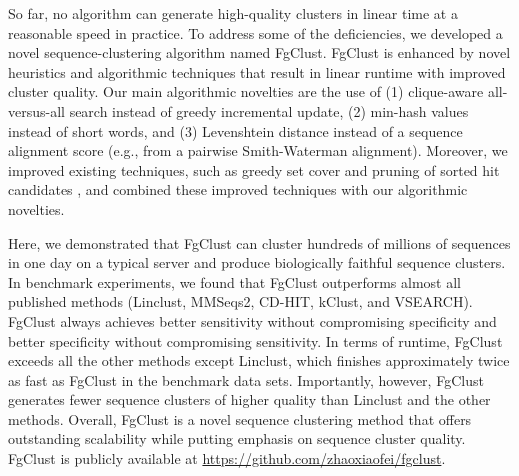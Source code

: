 \documentclass[11pt,letterpaper]{llncs2e/llncs}
\begin{document}
So far, no algorithm can generate high-quality clusters in linear time at a reasonable speed in practice.
To address some of the deficiencies,  we developed a novel sequence-clustering algorithm named FgClust.
FgClust is enhanced by novel heuristics and algorithmic techniques that result in linear runtime with improved cluster quality.
Our main algorithmic novelties are the use of (1) clique-aware all-versus-all search instead of greedy incremental update, (2) min-hash values instead of short words, and (3) Levenshtein distance instead of a sequence alignment score (e.g., from a pairwise Smith-Waterman alignment). Moreover, we improved existing techniques, such as greedy set cover \cite{steinegger2017mmseqs2} and pruning of sorted hit candidates \cite{edgar2010search}, and combined these improved techniques with our algorithmic novelties.

%

Here, we demonstrated that FgClust can cluster hundreds of millions of sequences in one day on a typical server and produce biologically faithful sequence clusters. In benchmark experiments, we found that FgClust outperforms almost all published methods (Linclust, MMSeqs2, CD-HIT, kClust, and VSEARCH). FgClust always achieves better sensitivity without compromising specificity and better specificity without compromising sensitivity. In terms of runtime, FgClust exceeds all the other methods except Linclust, which finishes approximately twice as fast as FgClust in the benchmark data sets. Importantly, however, FgClust generates fewer sequence clusters of higher quality than Linclust and the other methods. Overall, FgClust is a novel sequence clustering method that offers outstanding scalability while putting emphasis on sequence cluster quality. FgClust is publicly available at \url{https://github.com/zhaoxiaofei/fgclust}.
\end{document}

